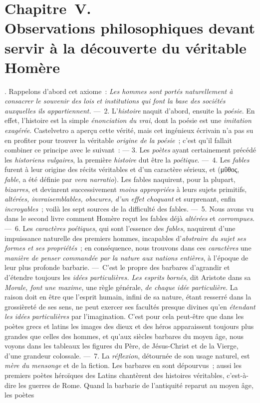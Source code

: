 \documentclass[french,twoside]{book} %
\newcommand\chapteropen{} %
\newcommand\chaptercont{} %
\begin{document}
\chapteropen
\chapter[{Chapitre V. Observations philosophiques devant servir à la découverte du véritable Homère}]{Chapitre V. \\
Observations philosophiques devant servir à la découverte du véritable Homère}

\chaptercont
{}. Rappelons d’abord cet axiome : {\itshape Les hommes sont portés naturellement à consacrer le souvenir des lois et institutions qui font la base des sociétés auxquelles ils appartiennent.} — 2. L’{\itshape histoire} naquit d’abord, ensuite la {\itshape poésie}. En effet, l’histoire est la simple {\itshape énonciation du vrai}, dont la poésie est une {\itshape imitation exagérée}. Castelvetro a aperçu cette vérité, mais cet ingénieux écrivain n’a pas su en profiter pour trouver la véritable {\itshape origine de la poésie} ; c’est qu’il fallait combiner ce principe avec le suivant : — 3. Les {\itshape poètes} ayant certainement précédé les {\itshape historiens vulgaires}, la première {\itshape histoire} dut être la {\itshape poétique}. — 4. Les {\itshape fables} furent à leur origine des récits véritables et d’un caractère sérieux, et (μῦθος, {\itshape fable}, a été définie par {\itshape vera narratio}). Les fables naquirent, pour la plupart, {\itshape bizarres}, et devinrent successivement {\itshape moins appropriées} à leurs sujets primitifs, {\itshape altérées, invraisemblables, obscures, d’un effet choquant} et surprenant, enfin {\itshape incroyables} ; voilà les sept sources de la difficulté des fables. — 5.  Nous avons vu dans le second livre comment Homère reçut les fables déjà {\itshape altérées} et {\itshape corrompues}. — 6. Les {\itshape caractères poétiques}, qui sont l’essence des {\itshape fables}, naquirent d’une impuissance naturelle des premiers hommes, incapables d’{\itshape abstraire du sujet ses formes et ses propriétés} ; en conséquence, nous trouvons dans ces {\itshape caractères} une {\itshape manière de penser commandée par la nature aux nations entières}, à l’époque de leur plus profonde barbarie. — C’est le propre des barbares d’agrandir et d’étendre toujours les {\itshape idées particulières. Les esprits bornés}, dit Aristote dans sa {\itshape Morale, font une maxime}, une règle générale, {\itshape de chaque idée particulière}. La raison doit en être que l’esprit humain, infini de sa nature, étant resserré dans la grossièreté de ses sens, ne peut exercer ses facultés presque divines qu’en {\itshape étendant les idées particulières} par l’imagination. C’est pour cela peut-être que dans les poètes grecs et latins les images des dieux et des héros apparaissent toujours plus grandes que celles des hommes, et qu’aux siècles barbares du moyen âge, nous voyons dans les tableaux les figures du Père, de Jésus-Christ et de la Vierge, d’une grandeur colossale. — 7. La {\itshape réflexion}, détournée de son usage naturel, est {\itshape mère du mensonge} et de la fiction. Les barbares en sont dépourvus ; aussi les premiers poètes héroïques des Latins chantèrent des histoires véritables, c’est-à-dire les guerres de Rome. Quand la barbarie de l’antiquité reparut au moyen âge, les poètes 
\end{document}
